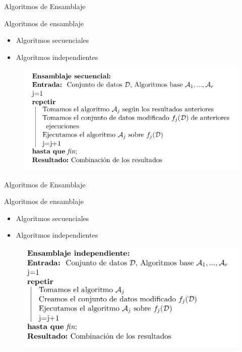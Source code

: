 \documentclass[10pt]{beamer}
\begin{document}
\begin{frame}[fragile]{Algoritmos de Ensamblaje}
\vspace{10px}
\pause
{}

\begin{block}{Algoritmos de ensamblaje}
	\begin{itemize}
		\item Algoritmos secuenciales
		\pause
		\item Algoritmos independientes
	\end{itemize}
\end{block}

\pause

\begin{figure}
	\centering
	\includegraphics[scale=0.3]{Imagenes/ensamblaje-secuencial}
\end{figure}

\end{frame}

\begin{frame}[fragile]{Algoritmos de Ensamblaje}
\vspace{10px}

\begin{block}{Algoritmos de ensamblaje}
	\begin{itemize}
		\item Algoritmos secuenciales

		\item Algoritmos independientes
	\end{itemize}
\end{block}

\begin{figure}
	\centering
	\includegraphics[scale=0.3]{Imagenes/ensamblaje-independiente}
\end{figure}

\end{frame}
\end{document}
